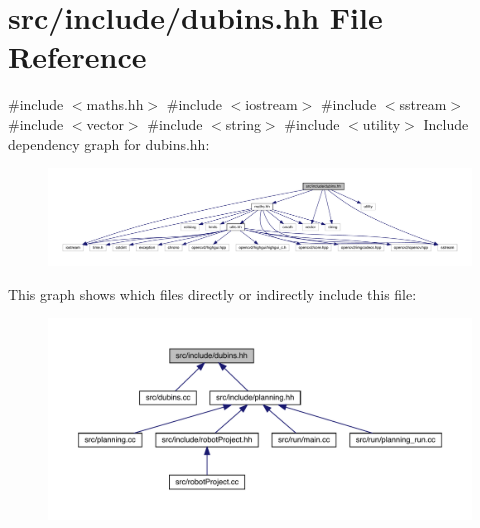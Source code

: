 \hypertarget{dubins_8hh}{}\section{src/include/dubins.hh File Reference}
\label{dubins_8hh}
{\ttfamily \#include $<$maths.\+hh$>$}\newline
{\ttfamily \#include $<$iostream$>$}\newline
{\ttfamily \#include $<$sstream$>$}\newline
{\ttfamily \#include $<$vector$>$}\newline
{\ttfamily \#include $<$string$>$}\newline
{\ttfamily \#include $<$utility$>$}\newline
Include dependency graph for dubins.\+hh\+:
\nopagebreak
\begin{figure}[H]
\begin{center}
\leavevmode
\includegraphics[width=350pt]{dubins_8hh__incl}
\end{center}
\end{figure}
This graph shows which files directly or indirectly include this file\+:
\nopagebreak
\begin{figure}[H]
\begin{center}
\leavevmode
\includegraphics[width=350pt]{dubins_8hh__dep__incl}
\end{center}
\end{figure}
